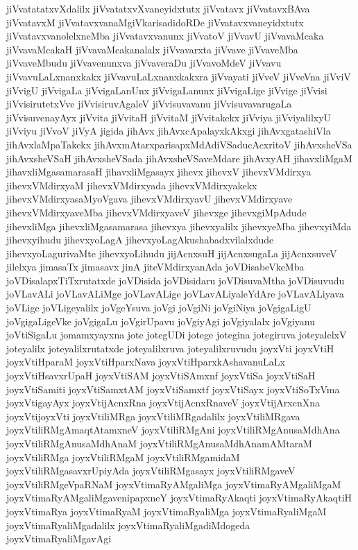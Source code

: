 {jiVvatatatxvXdalilx
jiVvatatxvXvaneyidxtutx
jiVvatavx
jiVvatavxBAva
jiVvatavxM
jiVvatavxvanaMgiVkarisadidoRDe
jiVvatavxvaneyidxtutx
jiVvatavxvanolelxneMba
jiVvatavxvanunx
jiVvatoV
jiVvavU
jiVvavaMcaka
jiVvavaMcakaH
jiVvavaMcakanalalx
jiVvavarxta
jiVvave
jiVvaveMba
jiVvaveMbudu
jiVvavenunxva
jiVvaveraDu
jiVvavoMdeV
jiVvavu
jiVvavuLaLxnanxkakx
jiVvavuLaLxnanxkakxra
jiVvayati
jiVveV
jiVveVna
jiVviV
jiVvigU
jiVvigaLa
jiVvigaLanUnx
jiVvigaLanunx
jiVvigaLige
jiVvige
jiVvisi
jiVvisirutetxVve
jiVvisiruvAgaleV
jiVvisuvavanu
jiVvisuvavarugaLa
jiVvisuvenayAyx
jiVvita
jiVvitaH
jiVvitaM
jiVvitakekx
jiVviya
jiVviyalilxyU
jiVviyu
jiVvoV
jiVyA
jigida
jihAvx
jihAvxcApalayxkAkxgi
jihAvxgatashiVla
jihAvxlaMpaTakekx
jihAvxmAtarxparisapxMdAdiVSaducAcxritoV
jihAvxsheVSa
jihAvxsheVSaH
jihAvxsheVSada
jihAvxsheVSaveMdare
jihAvxyAH
jihavxliMgaM
jihavxliMgasamarasaH
jihavxliMgasayx
jihevx
jihevxV
jihevxVMdirxya
jihevxVMdirxyaM
jihevxVMdirxyada
jihevxVMdirxyakekx
jihevxVMdirxyasaMyoVgava
jihevxVMdirxyavU
jihevxVMdirxyave
jihevxVMdirxyaveMba
jihevxVMdirxyaveV
jihevxge
jihevxgiMpAdude
jihevxliMga
jihevxliMgasamarasa
jihevxya
jihevxyalilx
jihevxyeMba
jihevxyiMda
jihevxyihudu
jihevxyoLagA
jihevxyoLagAkushabadxvilalxdude
jihevxyoLagurivaMte
jihevxyoLihudu
jijAcnxsuH
jijAcnxsugaLa
jijAcnxsuveV
jilelxya
jimasaTx
jimasavx
jinA
jiteVMdirxyanAda
joVDisabeVkeMba
joVDisalapxTiTxrutatxde
joVDisida
joVDisidaru
joVDisuvaMtha
joVDisuvudu
joVLavALi
joVLavALiMge
joVLavALige
joVLavALiyaleYdAre
joVLavALiyava
joVLige
joVLigeyalilx
joVgeYsuva
joVgi
joVgiNi
joVgiNiya
joVgigaLigU
joVgigaLigeVke
joVgigaLu
joVgirUpavu
joVgiyAgi
joVgiyalalx
joVgiyanu
joVtiSigaLu
jomamxyayxna
jote
jotegUDi
jotege
jotegina
jotegiruva
joteyalelxV
joteyalilx
joteyalilxrutatxde
joteyalilxruva
joteyalilxruvudu
joyxVti
joyxVtiH
joyxVtiHparaM
joyxVtiHparxNava
joyxVtiHparxkAshavanuLaLx
joyxVtiHsavxrUpaH
joyxVtiSAM
joyxVtiSAmxnf
joyxVtiSa
joyxVtiSaH
joyxVtiSamiti
joyxVtiSamxtAM
joyxVtiSamxtf
joyxVtiSayx
joyxVtiSoTxVma
joyxVtigayAyx
joyxVtijAcnxRna
joyxVtijAcnxRnaveV
joyxVtijArxcnXna
joyxVtijoyxVti
joyxVtiliMRga
joyxVtiliMRgadalilx
joyxVtiliMRgava
joyxVtiliRMgAmaqtAtamxneV
joyxVtiliRMgAni
joyxVtiliRMgAnusaMdhAna
joyxVtiliRMgAnusaMdhAnaM
joyxVtiliRMgAnusaMdhAnamAMtaraM
joyxVtiliRMga
joyxVtiliRMgaM
joyxVtiliRMgamidaM
joyxVtiliRMgasavxrUpiyAda
joyxVtiliRMgasayx
joyxVtiliRMgaveV
joyxVtiliRMgeVpaRNaM
joyxVtimaRyAMgaliMga
joyxVtimaRyAMgaliMgaM
joyxVtimaRyAMgaliMgavenipapxneY
joyxVtimaRyAkaqti
joyxVtimaRyAkaqtiH
joyxVtimaRya
joyxVtimaRyaM
joyxVtimaRyaliMga
joyxVtimaRyaliMgaM
joyxVtimaRyaliMgadalilx
joyxVtimaRyaliMgadiMdogeda
joyxVtimaRyaliMgavAgi
}
